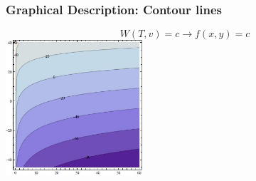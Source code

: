 \begin{frame}
\frametitle{Graphical Description: Contour lines}
%
$$W(T,v) = c \longrightarrow f(x,y) = c$$
%
\includegraphics[width=2in]{../images/windchill-contour.jpg}
\end{frame}
